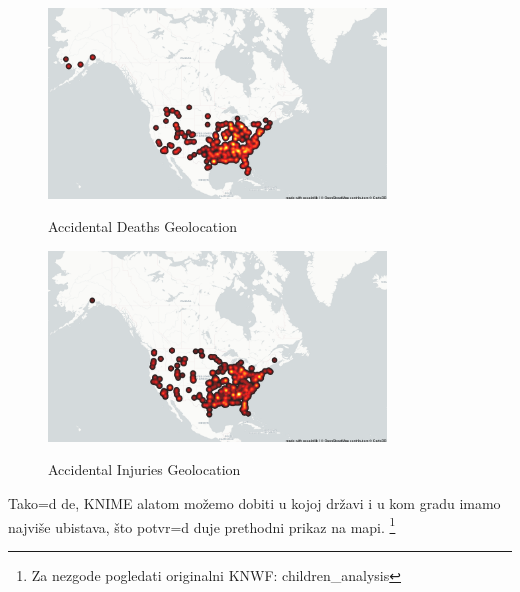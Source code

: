 \documentclass[12pt, a4paper]{article}
\def\dj{\leavevmode\setbox0=\hbox{d}\kern0pt
\rlap{\kern.215em\raise.46\ht0\hbox{-}}d}
\begin{document}
\begin{figure}[H]
\centering
\includegraphics[width=0.8\textwidth]{geo_accidental_deaths.png}
\label{fig:AccidentalGeo1}
\caption{Accidental Deaths Geolocation}\hspace{0.5cm} 
\break
\includegraphics[width=0.8\textwidth]{geo_accidental_injuries.png}
\label{fig:AccidentalGeo2}
\caption{Accidental Injuries Geolocation}
\end{figure}

Tako\dj e, KNIME alatom mo\v zemo dobiti u kojoj dr\v zavi i u kom gradu imamo najvi\v se ubistava, \v sto potvr\dj uje prethodni prikaz na mapi. \footnote{Za nezgode pogledati originalni KNWF: children\_analysis}
\end{document}
